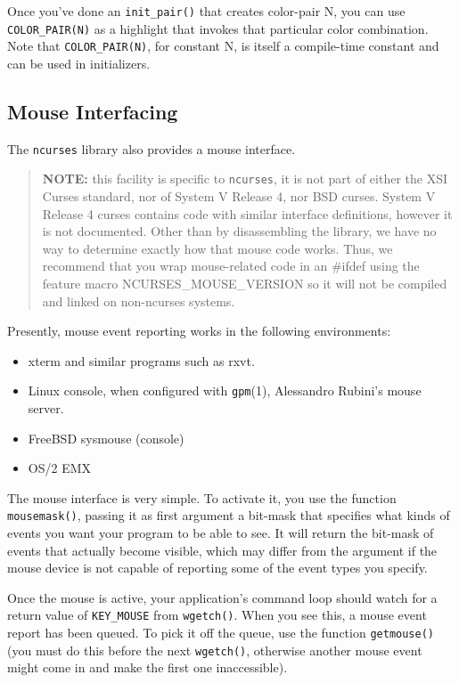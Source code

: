 Once you've done an \texttt{init\_pair()} that creates color-pair N, you can
use \texttt{COLOR\_PAIR(N)} as a highlight that invokes that particular
color combination.  Note that \texttt{COLOR\_PAIR(N)}, for constant N,
is itself a compile-time constant and can be used in initializers.

\subsection{Mouse Interfacing}

\label{f0:mouse}The \texttt{ncurses} library also provides a mouse interface.%

\begin{quotation} \textbf{NOTE:} this facility is specific to \texttt{ncurses}, it is not part of either
the XSI Curses standard, nor of System V Release 4, nor BSD curses.
System V Release 4 curses contains code with similar interface definitions,
however it is not documented.  Other than by disassembling the library, we
have no way to determine exactly how that mouse code works.
Thus, we recommend that you wrap mouse-related code in an \#ifdef using the
feature macro NCURSES\_MOUSE\_VERSION so it will not be compiled and linked
on non-ncurses systems.\end{quotation}
Presently, mouse event reporting works in the following environments:
\begin{itemize}
\item xterm and similar programs such as rxvt.
\item Linux console, when configured with \texttt{gpm}(1), Alessandro
Rubini's mouse server.
\item FreeBSD sysmouse (console)
\item OS/2 EMX
\end{itemize}

The mouse interface is very simple.  To activate it, you use the function
\texttt{mousemask()}, passing it as first argument a bit-mask that specifies
what kinds of events you want your program to be able to see.  It will
return the bit-mask of events that actually become visible, which may differ
from the argument if the mouse device is not capable of reporting some of
the event types you specify. 

Once the mouse is active, your application's command loop should watch
for a return value of \texttt{KEY\_MOUSE} from \texttt{wgetch()}.  When
you see this, a mouse event report has been queued.  To pick it off
the queue, use the function \texttt{getmouse()} (you must do this before
the next \texttt{wgetch()}, otherwise another mouse event might come
in and make the first one inaccessible). 


